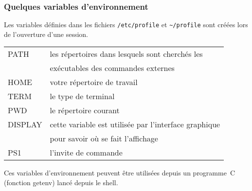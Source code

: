 \begin{frame}
  \frametitle{Quelques variables d'environnement}%
  Les variables d\'efinies dans les fichiers \texttt{/etc/profile} et
  \texttt{\~{}/profile} sont cr\'e\'ees lors de l'ouverture d'une
  session.
  \par\medskip
  \begin{tabular}{ll}
    PATH & les r\'epertoires dans lesquels sont cherch\'es les  \\
    &  ex\'ecutables des commandes externes \\ 
    HOME & votre r\'epertoire de travail \\
    TERM & le type de terminal \\
    PWD & le r\'epertoire courant \\
    DISPLAY & cette variable est utilis\'ee par l'interface graphique \\
    & pour savoir o\`u se fait l'affichage\\
    PS1 & l'invite de commande
  \end{tabular}
  \par\medskip
  Ces variables d'environnement peuvent \^etre utilis\'ees depuis un
  programme~C (fonction getenv) lanc\'e depuis le shell.
\end{frame}
